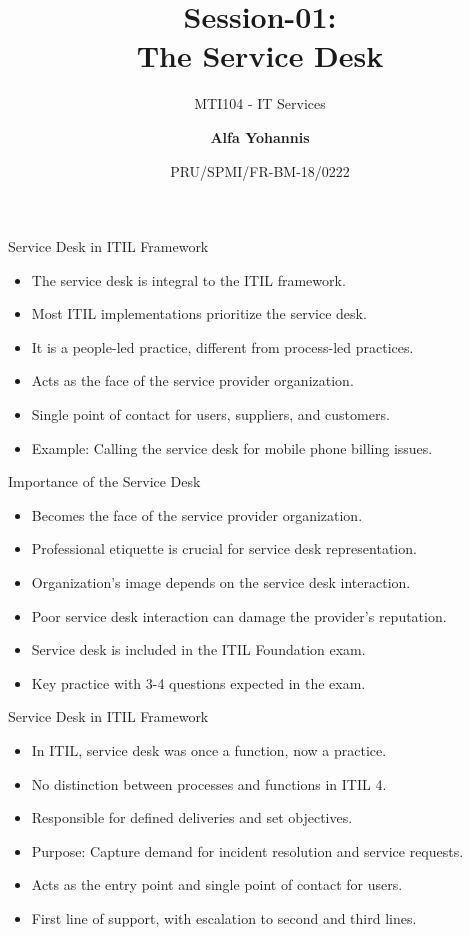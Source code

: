 \documentclass[aspectratio=169, table]{beamer}
\subtitle{MTI104 - IT Services}
\title{Session-01:\\\LARGE{The Service Desk\\}}
\date[Serial]{\scriptsize {PRU/SPMI/FR-BM-18/0222}}
\author[Pradita]{\small{\textbf{Alfa Yohannis}}}
\begin{document}
\frame{\titlepage}

\begin{frame}{Service Desk in ITIL Framework}
	\begin{itemize}
		\item The service desk is integral to the ITIL framework.
		\item Most ITIL implementations prioritize the service desk.
		\item It is a people-led practice, different from process-led practices.
		\item Acts as the face of the service provider organization.
		\item Single point of contact for users, suppliers, and customers.
		\item Example: Calling the service desk for mobile phone billing issues.
	\end{itemize}
\end{frame}

\begin{frame}{Importance of the Service Desk}
	\begin{itemize}
		\item Becomes the face of the service provider organization.
		\item Professional etiquette is crucial for service desk representation.
		\item Organization's image depends on the service desk interaction.
		\item Poor service desk interaction can damage the provider’s reputation.
		\item Service desk is included in the ITIL Foundation exam.
		\item Key practice with 3-4 questions expected in the exam.
	\end{itemize}
\end{frame}

\begin{frame}{Service Desk in ITIL Framework}
	\begin{itemize}
		\item In ITIL, service desk was once a function, now a practice.
		\item No distinction between processes and functions in ITIL 4.
		\item Responsible for defined deliveries and set objectives.
		\item Purpose: Capture demand for incident resolution and service requests.
		\item Acts as the entry point and single point of contact for users.
		\item First line of support, with escalation to second and third lines.
	\end{itemize}
\end{frame}
\end{document}
